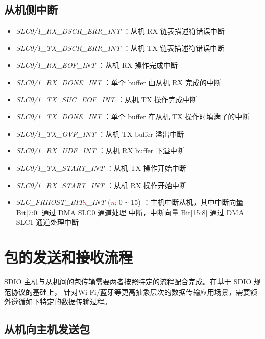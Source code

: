 \documentclass[main\_\_CN.tex]{subfiles}
\begin{document}
\subsection{从机侧中断}
\begin{itemize}
\item {\it SLC0/1\_RX\_DSCR\_ERR\_INT \label{int:SLC01RXDSCRERRINT}}：从机 RX 链表描述符错误中断
\item {\it SLC0/1\_TX\_DSCR\_ERR\_INT \label{int:SLC01TXDSCRERRINT}}：从机 TX 链表描述符错误中断
\item {\it SLC0/1\_RX\_EOF\_INT \label{int:SLC01RXEOFINT}}：从机 RX 操作完成中断
\item {\it SLC0/1\_RX\_DONE\_INT \label{int:SLC01RXDONEINT}}：单个 buffer 由从机 RX 完成的中断
\item {\it SLC0/1\_TX\_SUC\_EOF\_INT \label{int:SLC01TXSUCEOFINT}}：从机 TX 操作完成中断
\item {\it SLC0/1\_TX\_DONE\_INT \label{int:SLC01TXDONEINT}}：单个 buffer 在从机 TX 操作时填满了的中断
\item {\it SLC0/1\_TX\_OVF\_INT \label{int:SLC01TXOVFINT}}：从机 TX buffer 溢出中断
\item {\it SLC0/1\_RX\_UDF\_INT \label{int:SLC01RXUDFINT}}：从机 RX buffer 下溢中断
\item {\it SLC0/1\_TX\_START\_INT \label{int:SLC01TXSTARTINT}}：从机 TX 操作开始中断
\item {\it SLC0/1\_RX\_START\_INT \label{int:SLC01RXSTARTINT}}：从机 RX 操作开始中断
\item {\it SLC\_FRHOST\_BIT\textcolor{red}{\it{n}}\_INT \label{int:SLCFRHOSTBITnINT}} (\textcolor{red}{\it{n}}: 0 \verb+~+ 15) ：主机中断从机，其中中断向量 Bit[7:0] 通过 DMA SLC0 通道处理 中断，中断向量 Bit[15:8] 通过 DMA SLC1 通道处理中断
\end{itemize}

\section{包的发送和接收流程}

SDIO 主机与从机间的包传输需要两者按照特定的流程配合完成。在基于 SDIO 规范协议的基础上， \chipname{} 针对Wi-Fi/蓝牙等更高抽象层次的数据传输应用场景，需要额外遵循如下特定的数据传输过程。

\subsection{从机向主机发送包}
\end{document}
